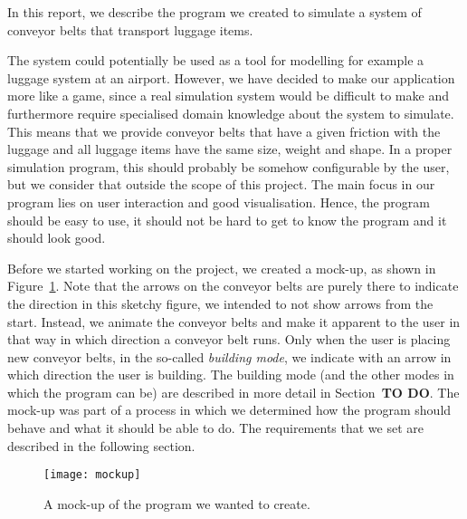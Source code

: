 In this report, we describe the program we created to simulate a system of conveyor belts that transport luggage items.

The system could potentially be used as a tool for modelling for example a luggage system at an airport. However, we have decided to make our application more like a game, since a real simulation system would be difficult to make and furthermore require specialised domain knowledge about the system to simulate. This means that we provide conveyor belts that have a given friction with the luggage and all luggage items have the same size, weight and shape. In a proper simulation program, this should probably be somehow configurable by the user, but we consider that outside the scope of this project. The main focus in our program lies on user interaction and good visualisation. Hence, the program should be easy to use, it should not be hard to get to know the program and it should look good.

Before we started working on the project, we created a mock-up, as shown in Figure~\ref{fig:mockup}. Note that the arrows on the conveyor belts are purely there to indicate the direction in this sketchy figure, we intended to not show arrows from the start. Instead, we animate the conveyor belts and make it apparent to the user in that way in which direction a conveyor belt runs. Only when the user is placing new conveyor belts, in the so-called \emph{building mode}, we indicate with an arrow in which direction the user is building. The building mode (and the other modes in which the program can be) are described in more detail in Section~\textbf{TO DO}. The mock-up was part of a process in which we determined how the program should behave and what it should be able to do. The requirements that we set are described in the following section.

\begin{figure}[b!]
  \begin{center}
    \texttt{[image: mockup]}
    \caption{A mock-up of the program we wanted to create.}
    \label{fig:mockup}
  \end{center}
\end{figure}


